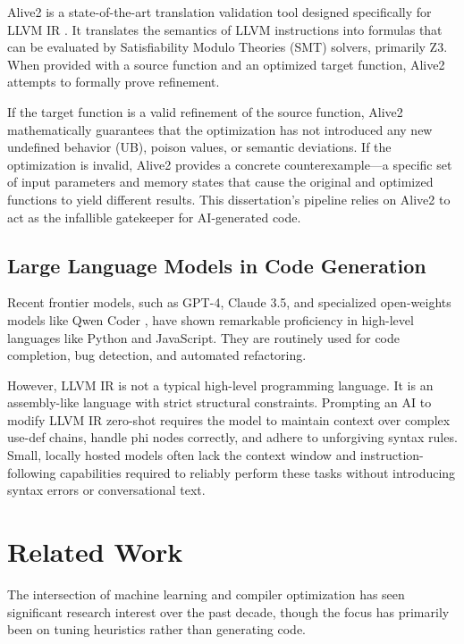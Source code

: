 \documentclass[conference,10pt]{IEEEtran}
\begin{document}
Alive2 is a state-of-the-art translation validation tool designed specifically for LLVM IR \cite{lopes2021alive2}. It translates the semantics of LLVM instructions into formulas that can be evaluated by Satisfiability Modulo Theories (SMT) solvers, primarily Z3. When provided with a source function and an optimized target function, Alive2 attempts to formally prove refinement. 

If the target function is a valid refinement of the source function, Alive2 mathematically guarantees that the optimization has not introduced any new undefined behavior (UB), poison values, or semantic deviations. If the optimization is invalid, Alive2 provides a concrete counterexample—a specific set of input parameters and memory states that cause the original and optimized functions to yield different results. This dissertation's pipeline relies on Alive2 to act as the infallible gatekeeper for AI-generated code.

\subsection{Large Language Models in Code Generation}
Recent frontier models, such as GPT-4, Claude 3.5, and specialized open-weights models like Qwen Coder \cite{qwen2024coder}, have shown remarkable proficiency in high-level languages like Python and JavaScript. They are routinely used for code completion, bug detection, and automated refactoring.

However, LLVM IR is not a typical high-level programming language. It is an assembly-like language with strict structural constraints. Prompting an AI to modify LLVM IR zero-shot requires the model to maintain context over complex use-def chains, handle phi nodes correctly, and adhere to unforgiving syntax rules. Small, locally hosted models often lack the context window and instruction-following capabilities required to reliably perform these tasks without introducing syntax errors or conversational text.

\section{Related Work}

The intersection of machine learning and compiler optimization has seen significant research interest over the past decade, though the focus has primarily been on tuning heuristics rather than generating code.
\end{document}
